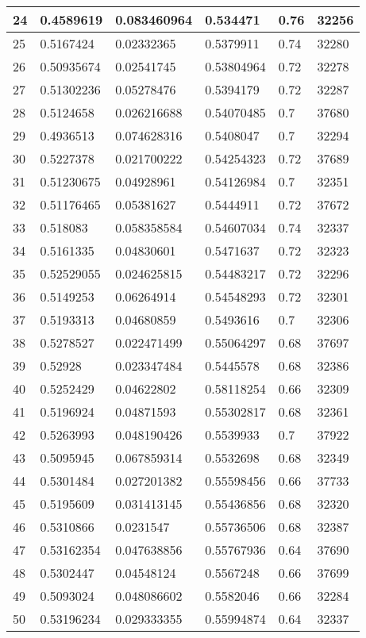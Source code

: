 \begin{longtable}{|l|l|l|l|l|l|}
24 & 0.4589619 & 0.083460964 & 0.534471 & 0.76 & 32256 \\ \hline 
25 & 0.5167424 & 0.02332365 & 0.5379911 & 0.74 & 32280 \\ \hline 
26 & 0.50935674 & 0.02541745 & 0.53804964 & 0.72 & 32278 \\ \hline 
27 & 0.51302236 & 0.05278476 & 0.5394179 & 0.72 & 32287 \\ \hline 
28 & 0.5124658 & 0.026216688 & 0.54070485 & 0.7 & 37680 \\ \hline 
29 & 0.4936513 & 0.074628316 & 0.5408047 & 0.7 & 32294 \\ \hline 
30 & 0.5227378 & 0.021700222 & 0.54254323 & 0.72 & 37689 \\ \hline 
31 & 0.51230675 & 0.04928961 & 0.54126984 & 0.7 & 32351 \\ \hline 
32 & 0.51176465 & 0.05381627 & 0.5444911 & 0.72 & 37672 \\ \hline 
33 & 0.518083 & 0.058358584 & 0.54607034 & 0.74 & 32337 \\ \hline 
34 & 0.5161335 & 0.04830601 & 0.5471637 & 0.72 & 32323 \\ \hline 
35 & 0.52529055 & 0.024625815 & 0.54483217 & 0.72 & 32296 \\ \hline 
36 & 0.5149253 & 0.06264914 & 0.54548293 & 0.72 & 32301 \\ \hline 
37 & 0.5193313 & 0.04680859 & 0.5493616 & 0.7 & 32306 \\ \hline 
38 & 0.5278527 & 0.022471499 & 0.55064297 & 0.68 & 37697 \\ \hline 
39 & 0.52928 & 0.023347484 & 0.5445578 & 0.68 & 32386 \\ \hline 
40 & 0.5252429 & 0.04622802 & 0.58118254 & 0.66 & 32309 \\ \hline 
41 & 0.5196924 & 0.04871593 & 0.55302817 & 0.68 & 32361 \\ \hline 
42 & 0.5263993 & 0.048190426 & 0.5539933 & 0.7 & 37922 \\ \hline 
43 & 0.5095945 & 0.067859314 & 0.5532698 & 0.68 & 32349 \\ \hline 
44 & 0.5301484 & 0.027201382 & 0.55598456 & 0.66 & 37733 \\ \hline 
45 & 0.5195609 & 0.031413145 & 0.55436856 & 0.68 & 32320 \\ \hline 
46 & 0.5310866 & 0.0231547 & 0.55736506 & 0.68 & 32387 \\ \hline 
47 & 0.53162354 & 0.047638856 & 0.55767936 & 0.64 & 37690 \\ \hline 
48 & 0.5302447 & 0.04548124 & 0.5567248 & 0.66 & 37699 \\ \hline 
49 & 0.5093024 & 0.048086602 & 0.5582046 & 0.66 & 32284 \\ \hline 
50 & 0.53196234 & 0.029333355 & 0.55994874 & 0.64 & 32337 \\ \hline 
\end{longtable}